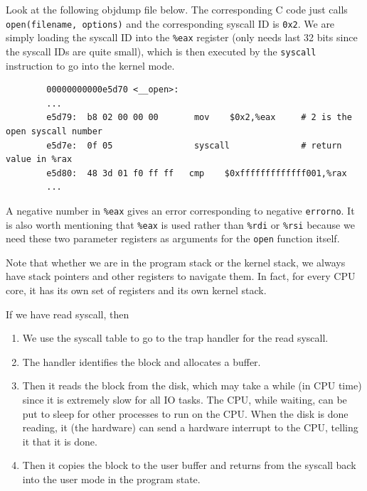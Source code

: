 \documentclass{article}
\newcounter{example}[section]
\newcounter{code}[section]
\begin{document}
    \begin{example}
      \label{ex:syscalls-of-open}
 
      Look at the following objdump file below. The corresponding C code just calls \texttt{open(filename, options)} and the corresponding syscall ID is \texttt{0x2}. We are simply loading the syscall ID into the \texttt{\%eax} register (only needs last 32 bits since the syscall IDs are quite small), which is then executed by the \texttt{syscall} instruction to go into the kernel mode. 
      \begin{lstlisting}
        00000000000e5d70 <__open>: 
        ...
        e5d79:  b8 02 00 00 00       mov    $0x2,%eax     # 2 is the open syscall number
        e5d7e:  0f 05                syscall              # return value in %rax
        e5d80:  48 3d 01 f0 ff ff   cmp    $0xfffffffffffff001,%rax 
        ... 
      \end{lstlisting}
      A negative number in \texttt{\%eax} gives an error corresponding to negative \texttt{errorno}. It is also worth mentioning that \texttt{\%eax} is used rather than \texttt{\%rdi} or \texttt{\%rsi} because we need these two parameter registers as arguments for the \texttt{open} function itself. 
    \end{example}

    Note that whether we are in the program stack or the kernel stack, we always have stack pointers and other registers to navigate them. In fact, for every CPU core, it has its own set of registers and its own kernel stack. 

    \begin{example}
      \label{ex:syscall-of-read}
      If we have read syscall, then 
      \begin{enumerate}
        \item We use the syscall table to go to the trap handler for the read syscall. 
        \item The handler identifies the block and allocates a buffer. 
        \item Then it reads the block from the disk, which may take a while (in CPU time) since it is extremely slow for all IO tasks. The CPU, while waiting, can be put to sleep for other processes to run on the CPU. When the disk is done reading, it (the hardware) can send a hardware interrupt to the CPU, telling it that it is done. 
        \item Then it copies the block to the user buffer and returns from the syscall back into the user mode in the program state. 
      \end{enumerate}
    \end{example}
\end{document}
